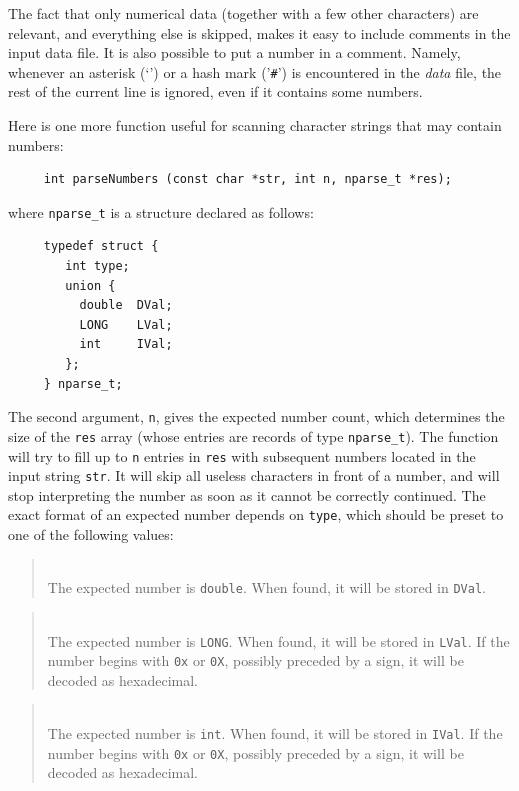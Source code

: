 The fact that only numerical data (together with a few other characters)
are relevant,
and everything else is skipped, makes it easy to include comments in the
input data file.
It is also possible to put a number in a comment.
Namely, whenever an asterisk (`{\tt *}') or a hash mark ('{\tt \#}') is encountered in the {\em data\/} file, the rest of the current line is ignored, even if it contains some numbers.

Here is one more function useful for scanning character strings that may
contain numbers:
\begin{verbatim}
     int parseNumbers (const char *str, int n, nparse_t *res);
\end{verbatim}
\noindent
where {\tt nparse\_t} is a structure declared as follows:
\begin{verbatim}
     typedef struct {
        int type;
        union {
          double  DVal;
          LONG    LVal;
          int     IVal;
        };
     } nparse_t;
\end{verbatim}
The second argument, {\tt n}, gives the expected number count, which
determines the size of the {\tt res} array (whose entries are records of
type {\tt nparse\_t}).
The function will try to fill up to {\tt n} entries in {\tt res} with
subsequent numbers located in the input string {\tt str}.
It will skip all useless characters in front of a number, and will stop
interpreting the number as soon as it cannot be correctly continued.
The exact format of an expected number depends on {\tt type}, which should
be preset to one of the following values:

\begin{quote}
\noindent{}\\ \hspace{0in}
The expected number is {\tt double}.
When found, it will be stored in {\tt DVal}.
\end{quote}

\begin{quote}
\noindent{}\\ \hspace{0in}
The expected number is {\tt LONG}.
When found, it will be stored in {\tt LVal}.
If the number begins with {\tt 0x} or {\tt 0X}, possibly preceded by a
sign, it will be decoded as hexadecimal.
\end{quote}

\begin{quote}
\noindent{}\\ \hspace{0in}
The expected number is {\tt int}.
When found, it will be stored in {\tt IVal}.
If the number begins with {\tt 0x} or {\tt 0X}, possibly preceded by a
sign, it will be decoded as hexadecimal.
\end{quote}

